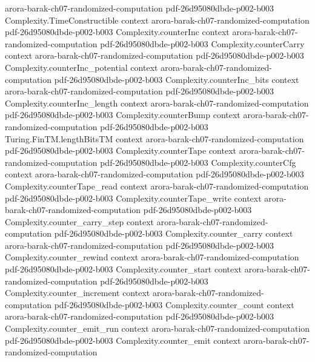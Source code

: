 \begin{theorem}
  {arora-barak-ch07-randomized-computation}
  {pdf-26d95080dbde-p002-b003}
\proofstep
  {Complexity.TimeConstructible}
  {context}
  {arora-barak-ch07-randomized-computation}
  {pdf-26d95080dbde-p002-b003}
\proofstep
  {Complexity.counterInc}
  {context}
  {arora-barak-ch07-randomized-computation}
  {pdf-26d95080dbde-p002-b003}
\proofstep
  {Complexity.counterCarry}
  {context}
  {arora-barak-ch07-randomized-computation}
  {pdf-26d95080dbde-p002-b003}
\proofstep
  {Complexity.counterInc_potential}
  {context}
  {arora-barak-ch07-randomized-computation}
  {pdf-26d95080dbde-p002-b003}
\proofstep
  {Complexity.counterInc_bits}
  {context}
  {arora-barak-ch07-randomized-computation}
  {pdf-26d95080dbde-p002-b003}
\proofstep
  {Complexity.counterInc_length}
  {context}
  {arora-barak-ch07-randomized-computation}
  {pdf-26d95080dbde-p002-b003}
\proofstep
  {Complexity.counterBump}
  {context}
  {arora-barak-ch07-randomized-computation}
  {pdf-26d95080dbde-p002-b003}
\proofstep
  {Turing.FinTM.lengthBitsTM}
  {context}
  {arora-barak-ch07-randomized-computation}
  {pdf-26d95080dbde-p002-b003}
\proofstep
  {Complexity.counterTape}
  {context}
  {arora-barak-ch07-randomized-computation}
  {pdf-26d95080dbde-p002-b003}
\proofstep
  {Complexity.counterCfg}
  {context}
  {arora-barak-ch07-randomized-computation}
  {pdf-26d95080dbde-p002-b003}
\proofstep
  {Complexity.counterTape_read}
  {context}
  {arora-barak-ch07-randomized-computation}
  {pdf-26d95080dbde-p002-b003}
\proofstep
  {Complexity.counterTape_write}
  {context}
  {arora-barak-ch07-randomized-computation}
  {pdf-26d95080dbde-p002-b003}
\proofstep
  {Complexity.counter_carry_step}
  {context}
  {arora-barak-ch07-randomized-computation}
  {pdf-26d95080dbde-p002-b003}
\proofstep
  {Complexity.counter_carry}
  {context}
  {arora-barak-ch07-randomized-computation}
  {pdf-26d95080dbde-p002-b003}
\proofstep
  {Complexity.counter_rewind}
  {context}
  {arora-barak-ch07-randomized-computation}
  {pdf-26d95080dbde-p002-b003}
\proofstep
  {Complexity.counter_start}
  {context}
  {arora-barak-ch07-randomized-computation}
  {pdf-26d95080dbde-p002-b003}
\proofstep
  {Complexity.counter_increment}
  {context}
  {arora-barak-ch07-randomized-computation}
  {pdf-26d95080dbde-p002-b003}
\proofstep
  {Complexity.counter_count}
  {context}
  {arora-barak-ch07-randomized-computation}
  {pdf-26d95080dbde-p002-b003}
\proofstep
  {Complexity.counter_emit_run}
  {context}
  {arora-barak-ch07-randomized-computation}
  {pdf-26d95080dbde-p002-b003}
\proofstep
  {Complexity.counter_emit}
  {context}
  {arora-barak-ch07-randomized-computation}

\end{theorem}
